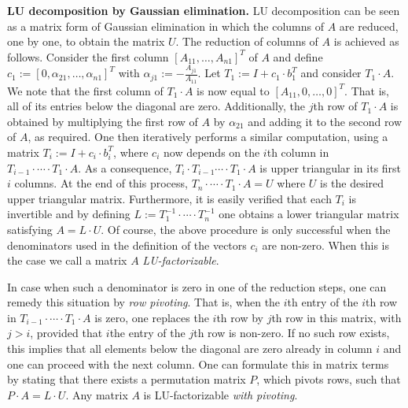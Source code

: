 \smallskip
\noindent
\textbf{LU decomposition by Gaussian elimination.} LU decomposition can be seen as a matrix form of Gaussian elimination in which the columns of $A$
are reduced, one by one, to obtain the matrix $U$. The reduction of columns of $A$ is achieved
as follows. Consider the first column $[A_{11},\ldots,A_{n1}]^T$ of $A$ and  define 
$c_1 := [0, \alpha_{21},\ldots, \alpha_{n1}]^T$ 
with $\alpha_{j1} := -\frac{A_{j1}}{A_{11}}$. Let $T_1:=I+ c_1\cdot b_1^T$ and consider
$T_1\cdot A$. We note that the first column of $T_1\cdot A$ is now equal to $[A_{11},0,\ldots,0]^T$. That is,
all of its entries below the diagonal are zero. Additionally, the $j$th row of $T_1\cdot A$ is obtained by multiplying the first row of $A$ by $\alpha_{21}$ and adding it to the second row of $A$, as required. One then iteratively performs a similar computation, using a matrix $T_i:=I+c_i\cdot b_i^T$, where $c_i$ now depends on the $i$th column in $T_{i-1}\cdot\cdots\cdot T_1\cdot A$. As a consequence, $T_i\cdot T_{i-1}\cdots \cdot T_1\cdot A$ is upper triangular
in its first $i$ columns. At the end of this process, $T_n\cdot\cdots\cdot T_1\cdot A=U$ where $U$ is the desired upper triangular matrix.
Furthermore, it is easily verified that each $T_i$ is invertible and by defining $L:=T_1^{-1}\cdot\cdots\cdot T_n^{-1}$ one obtains a lower triangular matrix satisfying $A=L\cdot U$. Of course, the above procedure is only successful when the denominators used in the definition of the vectors $c_i$ are non-zero. When this is the case we call a matrix $A$ \textit{LU-factorizable}. 

In case when such a denominator is zero in one of the reduction steps, one can remedy this situation by \textit{row pivoting}. That is, when the $i$th entry of the
$i$th row in $T_{i-1}\cdot\cdots\cdot T_1\cdot A$ is zero, one replaces the $i$th row by  $j$th row in this matrix, with $j>i$, provided that $i$the entry of the $j$th row is non-zero. If no such row exists, this implies that all elements below the diagonal are zero already in column $i$ and one can proceed with the next column. One can formulate this in matrix terms by stating that there exists a permutation matrix $P$, which pivots rows, such that $P\cdot A=L\cdot U$. Any matrix $A$ is LU-factorizable \textit{with pivoting}.
 
